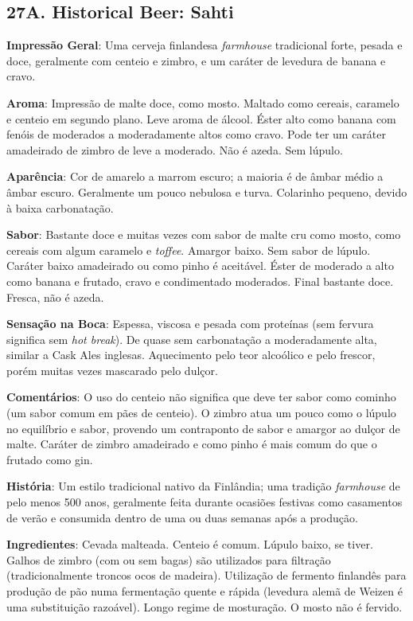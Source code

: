 \subsection*{27A. Historical Beer: Sahti}
\textbf{Impressão Geral}: Uma cerveja finlandesa \textit{farmhouse} tradicional forte, pesada e doce, geralmente com centeio e zimbro, e um caráter de levedura de banana e cravo.

\textbf{Aroma}: Impressão de malte doce, como mosto. Maltado como cereais, caramelo e centeio em segundo plano. Leve aroma de álcool. Éster alto como banana com fenóis de moderados a moderadamente altos como cravo. Pode ter um caráter amadeirado de zimbro de leve a moderado. Não é azeda. Sem lúpulo.

\textbf{Aparência}: Cor de amarelo a marrom escuro; a maioria é de âmbar médio a âmbar escuro. Geralmente um pouco nebulosa e turva. Colarinho pequeno, devido à baixa carbonatação.

\textbf{Sabor}: Bastante doce e muitas vezes com sabor de malte cru como mosto, como cereais com algum caramelo e \textit{toffee}. Amargor baixo. Sem sabor de lúpulo. Caráter baixo amadeirado ou como pinho é aceitável. Éster de moderado a alto como banana e frutado, cravo e condimentado moderados. Final bastante doce. Fresca, não é azeda.

\textbf{Sensação na Boca}: Espessa, viscosa e pesada com proteínas (sem fervura significa sem \textit{hot break}). De quase sem carbonatação a moderadamente alta, similar a Cask Ales inglesas. Aquecimento pelo teor alcoólico e pelo frescor, porém muitas vezes mascarado pelo dulçor.

\textbf{Comentários}: O uso do centeio não significa que deve ter sabor como cominho (um sabor comum em pães de centeio). O zimbro atua um pouco como o lúpulo no equilíbrio e sabor, provendo um contraponto de sabor e amargor ao dulçor de malte. Caráter de zimbro amadeirado e como pinho é mais comum do que o frutado como gin.

\textbf{História}: Um estilo tradicional nativo da Finlândia; uma tradição \textit{farmhouse} de pelo menos 500 anos, geralmente feita durante ocasiões festivas como casamentos de verão e consumida dentro de uma ou duas semanas após a produção.

\textbf{Ingredientes}: Cevada malteada. Centeio é comum. Lúpulo baixo, se tiver. Galhos de zimbro (com ou sem bagas) são utilizados para filtração (tradicionalmente troncos ocos de madeira). Utilização de fermento finlandês para produção de pão numa fermentação quente e rápida (levedura alemã de Weizen é uma substituição razoável). Longo regime de mosturação. O mosto não é fervido.

